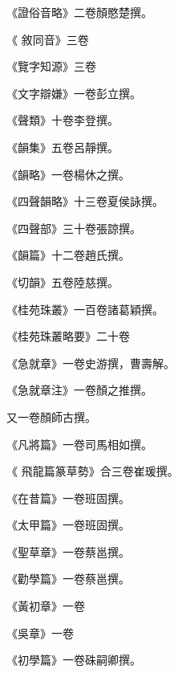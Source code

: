 \begin{pinyinscope}
 《證俗音略》二卷顏愍楚撰。



 《
 敘同音》三卷



 《覽字知源》三卷



 《文字辯嫌》一卷彭立撰。



 《聲類》十卷李登撰。



 《韻集》五卷呂靜撰。



 《韻略》一卷楊休之撰。



 《四聲韻略》十三卷夏侯詠撰。



 《四聲部》三十卷張諒撰。



 《韻篇》十二卷趙氏撰。



 《切韻》五卷陸慈撰。



 《桂苑珠叢》一百卷諸葛穎撰。



 《桂苑珠叢略要》二十卷



 《急就章》一卷史游撰，曹壽解。



 《急就章注》一卷顏之推撰。



 又一卷顏師古撰。



 《凡將篇》一卷司馬相如撰。



 《
 飛龍篇篆草勢》合三卷崔瑗撰。



 《在昔篇》一卷班固撰。



 《太甲篇》一卷班固撰。



 《聖草章》一卷蔡邕撰。



 《勸學篇》一卷蔡邕撰。



 《黃初章》一卷



 《吳章》一卷



 《初學篇》一卷硃嗣卿撰。




\end{pinyinscope}
